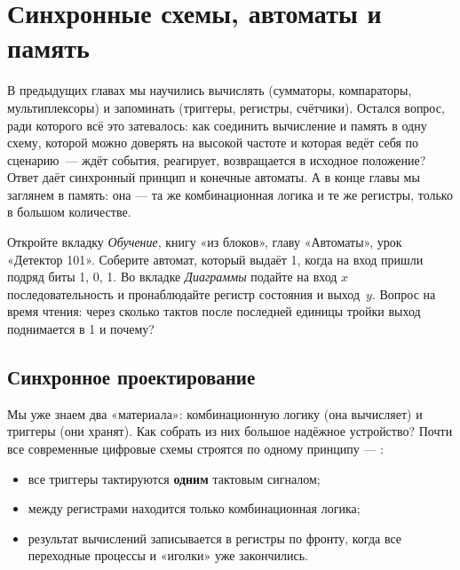 \chapter{Синхронные схемы, автоматы и память}
\label{ch:sync}

В предыдущих главах мы научились вычислять (сумматоры, компараторы, мультиплексоры)
и запоминать (триггеры, регистры, счётчики). Остался вопрос, ради которого
всё это затевалось: как соединить вычисление и память в одну схему, которой
можно доверять на высокой частоте и которая ведёт себя по сценарию~--- ждёт
события, реагирует, возвращается в исходное положение? Ответ даёт синхронный
принцип и конечные автоматы. А в конце главы мы заглянем в память: она ---
та же комбинационная логика и те же регистры, только в большом количестве.

\begin{buildbox}
Откройте вкладку \emph{Обучение}, книгу «из блоков», главу «Автоматы», урок
«Детектор 101». Соберите автомат, который выдаёт 1, когда на вход пришли
подряд биты 1, 0, 1. Во вкладке \emph{Диаграммы} подайте на вход $x$
последовательность  и пронаблюдайте регистр состояния и
выход~$y$. Вопрос на время чтения: через сколько тактов после последней
единицы тройки выход поднимается в 1 и почему?
\end{buildbox}

\section{Синхронное проектирование}

Мы уже знаем два «материала»: комбинационную логику (она вычисляет) и
триггеры (они хранят). Как собрать из них большое надёжное устройство?
Почти все современные цифровые схемы строятся по одному принципу ---
:

\begin{itemize}
  \item все триггеры тактируются \textbf{одним} тактовым сигналом;
  \item между регистрами находится только комбинационная логика;
  \item результат вычислений записывается в регистры по фронту, когда все
        переходные процессы и «иголки» уже закончились.
\end{itemize}

